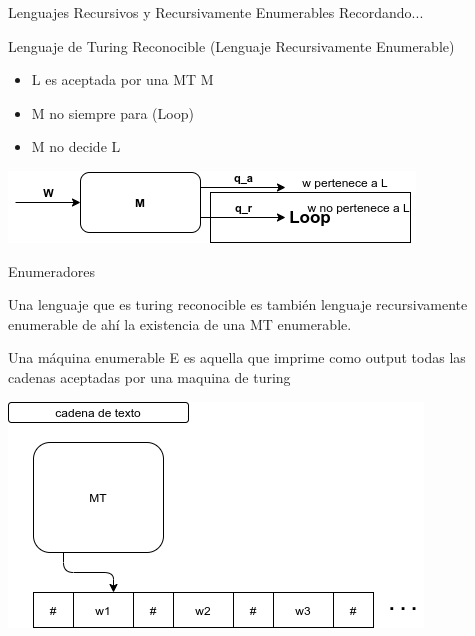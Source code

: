 \documentclass[11pt]{beamer}
\begin{document}
		\begin{frame}{Lenguajes Recursivos y Recursivamente Enumerables}
			\justifying
			Recordando...
            \begin{definition}
                Lenguaje de Turing Reconocible (Lenguaje Recursivamente Enumerable)
                \begin{itemize}
                    \item L es aceptada por una MT M
                    \item M no siempre para (Loop)
                    \item M no decide L
                \end{itemize}
            \end{definition}
    	    \begin{center}
	        \includegraphics[scale=0.5]{img/lenTurRec_rec_enume.png}
    		\end{center}
		\end{frame}
		
	    \begin{frame}{Enumeradores}
			\justifying
            \begin{definition}
                Una lenguaje que es turing reconocible es también lenguaje recursivamente enumerable de ahí la existencia de una MT enumerable.
            \end{definition}
            Una máquina enumerable E es aquella que imprime como output todas las cadenas aceptadas por una maquina de turing

    	    \begin{center}
	        \includegraphics[scale=0.5]{img/turingmachines.png}
    		\end{center}
  
		\end{frame}
		
\end{document}
